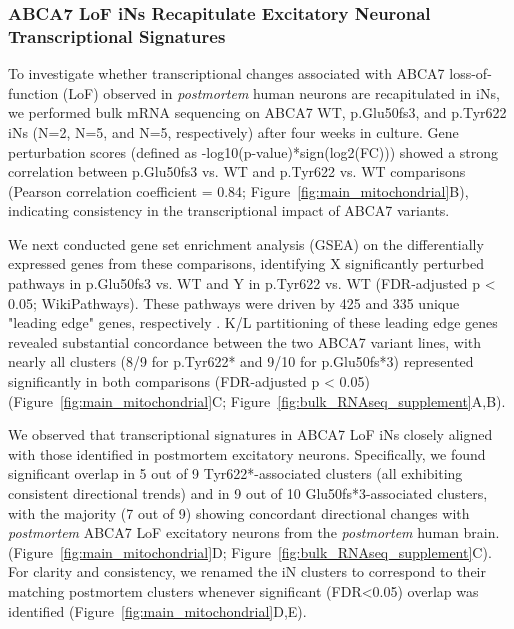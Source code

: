 \subsubsection{ABCA7 LoF iNs Recapitulate Excitatory Neuronal Transcriptional Signatures}
To investigate whether transcriptional changes associated with ABCA7 loss-of-function (LoF) observed in \emph{postmortem} human neurons are recapitulated in iNs, we performed bulk mRNA sequencing on ABCA7 WT, p.Glu50fs3, and p.Tyr622 iNs (N=2, N=5, and N=5, respectively) after four weeks in culture. Gene perturbation scores (defined as -log10(p-value)*sign(log2(FC))) showed a strong correlation between p.Glu50fs3 vs. WT and p.Tyr622 vs. WT comparisons (Pearson correlation coefficient = 0.84; Figure~\ref{fig:main_mitochondrial}B), indicating consistency in the transcriptional impact of ABCA7 variants.

We next conducted gene set enrichment analysis (GSEA) on the differentially expressed genes from these comparisons, identifying X significantly perturbed pathways in p.Glu50fs3 vs. WT and Y in p.Tyr622 vs. WT (FDR-adjusted p < 0.05; WikiPathways). These pathways were driven by 425 and 335 unique "leading edge" genes, respectively \cite{Subramanian2005-pu}. K/L partitioning of these leading edge genes revealed substantial concordance between the two ABCA7 variant lines, with nearly all clusters (8/9 for p.Tyr622* and 9/10 for p.Glu50fs*3) represented significantly in both comparisons (FDR-adjusted p < 0.05) (Figure~\ref{fig:main_mitochondrial}C; Figure~\ref{fig:bulk_RNAseq_supplement}A,B).

We observed that transcriptional signatures in ABCA7 LoF iNs closely aligned with those identified in postmortem excitatory neurons. Specifically, we found significant overlap in 5 out of 9 Tyr622*-associated clusters (all exhibiting consistent directional trends) and in 9 out of 10 Glu50fs*3-associated clusters, with the majority (7 out of 9) showing concordant directional changes with \emph{postmortem} ABCA7 LoF excitatory neurons from the \emph{postmortem} human brain. (Figure~\ref{fig:main_mitochondrial}D; Figure~\ref{fig:bulk_RNAseq_supplement}C). For clarity and consistency, we renamed the iN clusters to correspond to their matching postmortem clusters whenever significant (FDR<0.05) overlap was identified (Figure~\ref{fig:main_mitochondrial}D,E).


